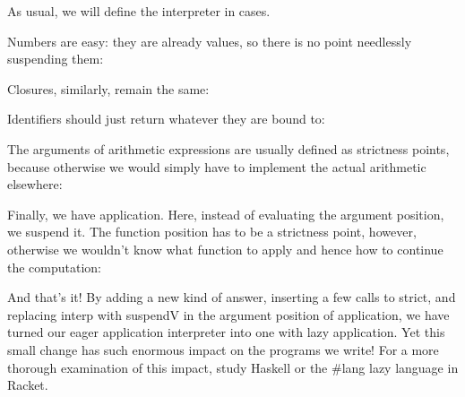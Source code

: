 
As usual, we will define the interpreter in cases.

Numbers are easy: they are already values, so there is no point needlessly
suspending them:

Closures, similarly, remain the same:

Identifiers should just return whatever they are bound to:

The arguments of arithmetic expressions are usually defined as strictness
points, because otherwise we would simply have to implement the actual
arithmetic elsewhere:

Finally, we have application. Here, instead of evaluating the argument position,
we suspend it. The function position has to be a strictness point, however,
otherwise we wouldn’t know what function to apply and hence how to continue the
computation:

And that’s it! By adding a new kind of answer, inserting a few calls to strict,
and replacing interp with suspendV in the argument position of application, we
have turned our eager application interpreter into one with lazy application.
Yet this small change has such enormous impact on the programs we write! For a
more thorough examination of this impact, study Haskell or the \#lang lazy
language in Racket.



